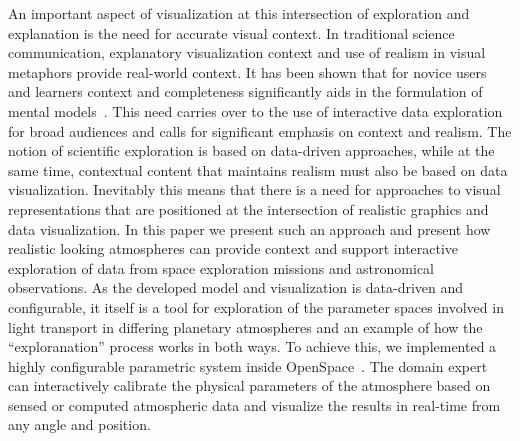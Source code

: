 \documentclass[journal]{vgtc}                %
\newcommand{\joncomment}[1]{\textbf{[JC~} \textcolor{red}{#1} \textbf{~]}}
\begin{document}
An important aspect of visualization at this intersection of exploration and explanation is the need for accurate visual context. In traditional science communication, explanatory visualization context and use of realism in visual metaphors provide real-world context. It has been shown that for novice users and learners context and completeness significantly aids in the formulation of mental models~\cite{KOZMA2003205}. This need carries over to the use of interactive data exploration for broad audiences and calls for significant emphasis on context and realism. The notion of scientific exploration is based on data-driven approaches, while at the same time, contextual content that maintains realism must also be based on data visualization. Inevitably this means that there is a need for approaches to visual representations that are positioned at the intersection of realistic graphics and data visualization. In this paper we present such an approach and present how realistic looking atmospheres can provide context and support interactive exploration of data from space exploration missions and astronomical observations. As the developed model and visualization is data-driven and configurable, it itself is a tool for exploration of the parameter spaces involved in light transport in differing planetary atmospheres and an example of how the ``exploranation'' process works in both ways.  
%
%
%
%
%
To achieve this, we implemented a highly configurable parametric system inside OpenSpace~\cite{OpenSpace:2020}. The domain expert can interactively calibrate the physical parameters of the atmosphere based on sensed or computed atmospheric data and visualize the results in real-time from any angle and position. 
 
\end{document}

